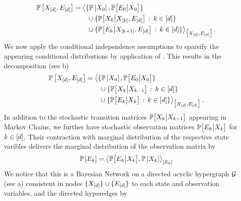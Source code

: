 \begin{example}
\begin{align*}
        \mathbb{P}\left[X_{[d]},E_{[d]}\right]
        & = \big\langle 
            \{\mathbb{P}\left[X_{0}\right],\mathbb{P}\big[E_{0}\big|X_{0}\big]\} \\
            & \quad\quad  \cup \{\mathbb{P}\big[X_{k}\big|X_{[k]},E_{[d]}\big] \,:\, k\in[d]\} \\
            & \quad\quad \cup \{\mathbb{P}\big[E_{k}\big|X_{[k+1]},E_{[d]}\big] \,:\, k\in[d]\}
         \big\rangle_{\big[ 
            X_{[d]},E_{[d]}
         \big]} \, .
    \end{align*}
    We now apply the conditional independence assumptions to sparsify the appearing conditional distributions by application of .
    This results in the decomposition (see b)
    \begin{align*}
        \mathbb{P}\left[X_{[d]},E_{[d]}\right]
        & = \big\langle 
            \{\mathbb{P}\left[X_{0}\right],\mathbb{P}\big[E_{0}\big|X_{0}\big]\} \\
            & \quad\quad  \cup \{\mathbb{P}\big[X_{k}\big|X_{k-1}\big] \,:\, k\in[d]\} \\
            & \quad\quad \cup \{\mathbb{P}\big[E_{k}\big|X_{k}\big] \,:\, k\in[d]\}
         \big\rangle_{\big[ 
            X_{[d]},E_{[d]}
         \big]} \, .
    \end{align*}
    In addition to the stochastic transition matrices $\mathbb{P}\big[X_{k}\big|X_{k-1}\big]$ appearing in Markov Chains, we further have stochastic observation matrices $\mathbb{P}\big[E_{k}\big|X_{k}\big]$ for $k\in[d]$.
    Their contraction with marginal distribution of the respective state varibles delivers the marginal distribution of the observation matrix by
    \begin{align*}
        \mathbb{P}\left[E_{k}\right]
        = \left\langle \mathbb{P}\big[E_{k}\big|X_{k}\big],\mathbb{P}\left[X_{k}\right]\right\rangle_{\left[ E_{k} \right]}
    \end{align*}
    We notice that this is a Bayesian Network on a directed acyclic hypergraph $\mathcal{G}$ (see a) consistent in nodes $\{X_{[d]}\}\cup\{E_{[d]}\}$ to each state and observation variables, and the directed hyperedges by

\end{example}
